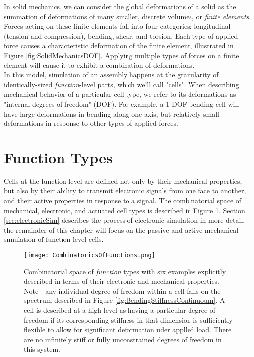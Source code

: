 {In solid mechanics, we can consider the global deformations of a solid as the summation of deformations of many smaller, discrete volumes, or \textit{finite elements}.  Forces acting on these finite elements fall into four categories: longitudinal (tension and compression), bending, shear, and torsion.  Each type of applied force causes a characteristic deformation of the finite element, illustrated in Figure \ref{fig:SolidMechanicsDOF}.  Applying multiple types of forces on a finite element will cause it to exhibit a combination of deformations.\\

In this model, simulation of an assembly happens at the granularity of identically-sized \textit{function}-level parts, which we'll call "cells".  When describing mechanical behavior of a particular cell type, we refer to its deformations as "internal degrees of freedom" (DOF).  For example, a 1-DOF bending cell will have large deformations in bending along one axis, but relatively small deformations in response to other types of applied forces.\\

\section{Function Types}

Cells at the function-level are defined not only by their mechanical properties, but also by their ability to transmit electronic signals from one face to another, and their active properties in response to a signal. The combinatorial space of mechanical, electronic, and actuated cell types is described in Figure \ref{fig:CombinatoricsOfFunctions}.  Section \ref{sec:electronicSim} describes the process of electronic simulation in more detail, the remainder of this chapter will focus on the passive and active mechanical simulation of function-level cells.
\\

\begin{figure}
  \texttt{[image: CombinatoricsOfFunctions.png]}
  \caption{Combinatorial space of \textit{function} types with six examples explicitly described in terms of their electronic and mechanical properties.  Note - any individual degree of freedom within a cell falls on the spectrum described in Figure \ref{fig:BendingStiffnessContinuoum}.  A cell is described at a high level as having a particular degree of freedom if its corresponding stiffness in that dimension is sufficiently flexible to allow for significant deformation uder applled load.  There are no infinitely stiff or fully unconstrained degrees of freedom in this system.}
  \label{fig:CombinatoricsOfFunctions}
\end{figure}

}
